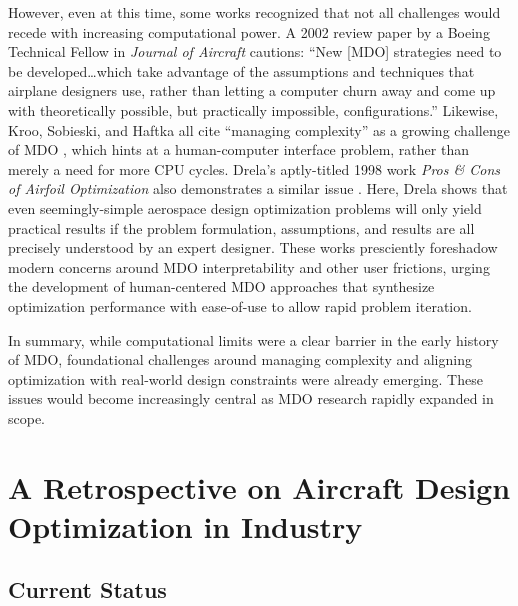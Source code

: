 However, even at this time, some works recognized that not all challenges would recede with increasing computational power. A 2002 review paper by a Boeing Technical Fellow in \textit{Journal of Aircraft} \cite{mcmasters_airplane_2002} cautions: ``New [MDO] strategies need to be developed\dots which take advantage of the assumptions and techniques that airplane designers use, rather than letting a computer churn away and come up with theoretically possible, but practically impossible, configurations.'' Likewise, Kroo, Sobieski, and Haftka all cite ``managing complexity'' as a growing challenge of MDO \cite{kroo_multidisciplinary_1997, haftka_multidisciplinary_1997, belie_nontechnical_2002}, which hints at a human-computer interface problem, rather than merely a need for more CPU cycles. Drela's aptly-titled 1998 work \textit{Pros \& Cons of Airfoil Optimization} also demonstrates a similar issue \cite{drela_pros_1998}. Here, Drela shows that even seemingly-simple aerospace design optimization problems will only yield practical results if the problem formulation, assumptions, and results are all precisely understood by an expert designer. These works presciently foreshadow modern concerns around MDO interpretability and other user frictions, urging the development of human-centered MDO approaches that synthesize optimization performance with ease-of-use to allow rapid problem iteration.

In summary, while computational limits were a clear barrier in the early history of MDO, foundational challenges around managing complexity and aligning optimization with real-world design constraints were already emerging. These issues would become increasingly central as MDO research rapidly expanded in scope.


\section{A Retrospective on Aircraft Design Optimization in Industry}
\label{sec:industry}

\subsection*{Current Status}

